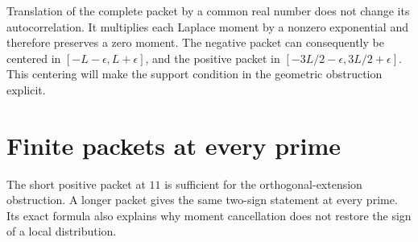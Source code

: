 \documentclass[11pt,letterpaper]{article}
\theoremstyle{definition}
\theoremstyle{remark}
\begin{document}
Translation of the complete packet by a common real number
does not change its autocorrelation. It multiplies each
Laplace moment by a nonzero exponential and therefore
preserves a zero moment. The negative packet can consequently
be centered in $[-L-\epsilon,L+\epsilon]$, and the positive
packet in $[-3L/2-\epsilon,3L/2+\epsilon]$. This centering
will make the support condition in the geometric obstruction
explicit.

\section{Finite packets at every prime}
\label{sec:all-primes}

The short positive packet at $11$ is sufficient for the
orthogonal-extension obstruction. A longer packet gives the
same two-sign statement at every prime. Its exact formula
also explains why moment cancellation does not restore the
sign of a local distribution.
\end{document}
